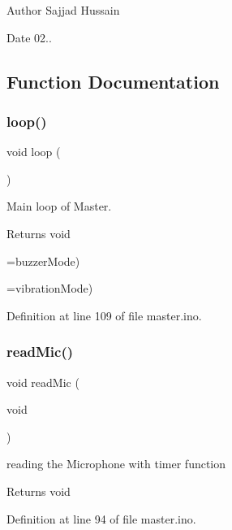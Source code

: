 \begin{DoxyAuthor}{Author}
Sajjad Hussain
\end{DoxyAuthor}
\begin{DoxyDate}{Date}
02.. 
\end{DoxyDate}


\subsection{Function Documentation}
\mbox{\label{master_8ino_afe461d27b9c48d5921c00d521181f12f}} 
\subsubsection{\texorpdfstring{loop()}{loop()}}
{\footnotesize\ttfamily void loop (\begin{DoxyParamCaption}{ }\end{DoxyParamCaption})}



Main loop of Master. 

\begin{DoxyReturn}{Returns}
void 
\end{DoxyReturn}
=buzzer\+Mode)

=vibration\+Mode) 

Definition at line 109 of file master.\+ino.

\mbox{\label{master_8ino_acb567cd7c0b4da511205a0194cb9da81}} 
\subsubsection{\texorpdfstring{readMic()}{readMic()}}
{\footnotesize\ttfamily void read\+Mic (\begin{DoxyParamCaption}\item[{void}]{ }\end{DoxyParamCaption})}



reading the Microphone with timer function 

\begin{DoxyReturn}{Returns}
void 
\end{DoxyReturn}


Definition at line 94 of file master.\+ino.

